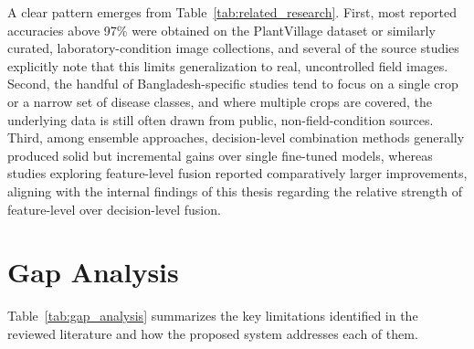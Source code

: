 A clear pattern emerges from Table~\ref{tab:related_research}. First, most reported accuracies above 97\% \cite{islam2020potato,chowdhury2023lightweight,ferentinos2018deep,alhammad2025potatoxai} were obtained on the PlantVillage dataset or similarly curated, laboratory-condition image collections, and several of the source studies explicitly note that this limits generalization to real, uncontrolled field images. Second, the handful of Bangladesh-specific studies \cite{uddin2021jute,himel2022bdcrops,ahad2023rice,mehnaz2025dhanshomadhan,ricepaddy_efficientnetb3_maskrcnn} tend to focus on a single crop or a narrow set of disease classes, and where multiple crops are covered, the underlying data is still often drawn from public, non-field-condition sources. Third, among ensemble approaches, decision-level combination methods \cite{ahad2023rice,catalreis2022wheat,multiscale_wheat_fusion_2025} generally produced solid but incremental gains over single fine-tuned models, whereas studies exploring feature-level fusion \cite{ensemble_featurefusion_2025,glnet2024wheat} reported comparatively larger improvements, aligning with the internal findings of this thesis regarding the relative strength of feature-level over decision-level fusion.

\section{Gap Analysis}

Table~\ref{tab:gap_analysis} summarizes the key limitations identified in the reviewed literature and how the proposed system addresses each of them.

